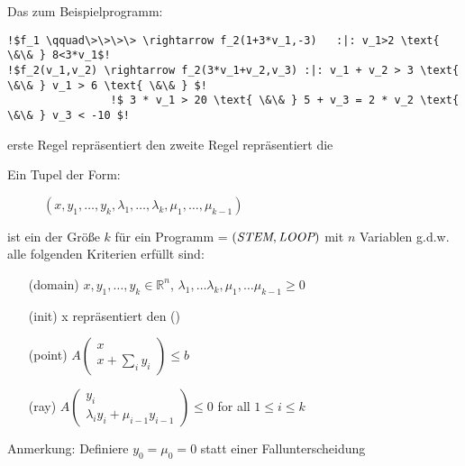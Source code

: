 \begin{frame}[fragile]
	\begin{example}
		Das \its zum Beispielprogramm: \newline
		\begin{lstlisting}[linewidth=10.5cm, escapechar = !]
!$f_1 \qquad\>\>\>\> \rightarrow f_2(1+3*v_1,-3)   :|: v_1>2 \text{ \&\& } 8<3*v_1$!
!$f_2(v_1,v_2) \rightarrow f_2(3*v_1+v_2,v_3) :|: v_1 + v_2 > 3 \text{ \&\& } v_1 > 6 \text{ \&\& } $!
				!$ 3 * v_1 > 20 \text{ \&\& } 5 + v_3 = 2 * v_2 \text{ \&\& } v_3 < -10 $!
		\end{lstlisting}
		erste Regel repr\"asentiert den \stem \newline
		zweite Regel repr\"asentiert die \loopt
	\end{example}	
\end{frame}

\begin{frame}
	\begin{definition}
		\label{def:gna}
		Ein Tupel der Form:
		\vspace{-1em}
		\begin{figure}
			\centering
			$(x, y_1, \dots, y_k, \lambda_1, \dots, \lambda_k, \mu_1, \dots, \mu_{k-1})$
		\end{figure}  
		\vspace{-1em}
		ist ein \gna der Gr\"oße $k$ f\"ur ein Programm = $(\textit{STEM}, \textit{LOOP})$ mit $n$ Variablen g.d.w. alle folgenden Kriterien erf\"ullt sind:
		\begin{itemize}
			\setlength{\itemindent}{1in}
			\item[(domain)] $x, y_1, \dots, y_k \in \mathbb{R}^n$, $\lambda_1, \dots \lambda_k, \mu_1, \dots \mu_{k-1} \ge 0$
			\item[(init)] x repr\"asentiert den \startterm (\stem)
			\item[(point)] $A\begin{pmatrix} x \\ x + \sum_i y_i \end{pmatrix} \le b$
			\item[(ray)] $A\begin{pmatrix} y_i \\ \lambda_i y_i + \mu_{i-1} y_{i-1} \end{pmatrix} \le 0$ for all $1 \le i \le k$
		\end{itemize}
		Anmerkung: Definiere $y_0 = \mu_0 = 0$ statt einer Fallunterscheidung
	\end{definition}
\end{frame}

